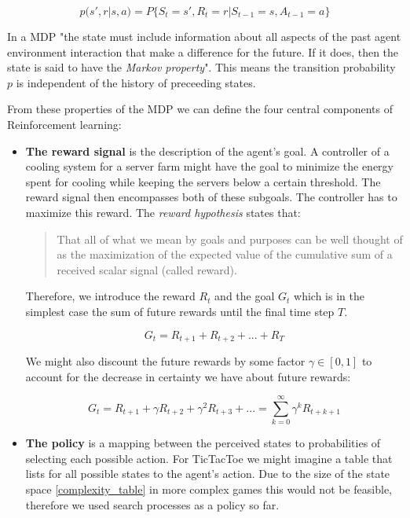 \begin{equation}
    p(s', r | s, a) = P\{S_t=s', R_t = r | S_{t-1} = s, A_{t-1}=a\}
\end{equation}

In a MDP "the state must include information about all aspects of the past agent environment interaction that make a difference for the future. If it does, then the state is said to have the \textit{Markov property}". \cite[p. 48]{sutton_reinforcement_2018} This means the transition probability $p$ is independent of the history of preceeding states.

From these properties of the MDP we can define the four central components of Reinforcement learning:

\begin{itemize}
    \item \textbf{The reward signal} is the description of the agent's goal. A controller of a cooling system for a server farm might have the goal to minimize the energy spent for cooling while keeping the servers below a certain threshold. The reward signal then encompasses both of these subgoals. The controller has to maximize this reward. The \textit{reward hypothesis} states that:
          \begin{quotation}
              That all of what we mean by goals and purposes can be well thought of as the maximization of the expected value of the cumulative sum of a received scalar signal (called reward). \cite[p. 52]{sutton_reinforcement_2018}
          \end{quotation}
          Therefore, we introduce the reward $R_t $ and the goal $ G_t $ which is in the simplest case the sum of future rewards until the final time step $T$.

          \begin{equation}
              G_t = R_{t+1} + R_{t+2} + ... + R_T
          \end{equation}

          We might also discount the future rewards by some factor $\gamma \in [0, 1] $ to account for the decrease in certainty we have about future rewards:

          \begin{equation}
              G_t = R_{t+1} + \gamma R_{t+2} + \gamma^2 R_{t+3} + ... = \sum_{k=0}^{\infty} \gamma^kR_{t+k+1}
          \end{equation}

    \item \textbf{The policy} is a mapping between the perceived states to probabilities of selecting each possible action. For TicTacToe we might imagine a table that lists for all possible states to the agent's action. Due to the size of the state space \ref{complexity_table} in more complex games this would not be feasible, therefore we used search processes as a policy so far.


\end{itemize}
